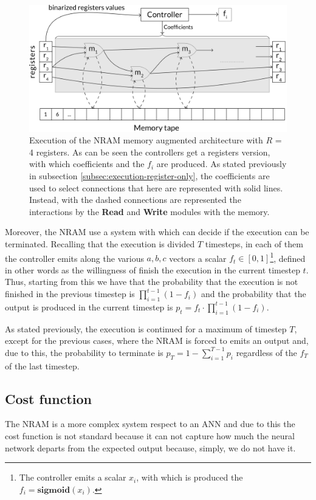 \begin{figure}[t!]
	\centering
	\includegraphics[width=\textwidth]{figures/memory-augmented-model.png}
	\caption{Execution of the NRAM memory augmented architecture with $R$ = 4 registers. As can be seen the controllers get a registers  version, with which coefficients and the $f_{i}$ are produced. As stated previously in subsection \ref{subsec:execution-register-only}, the coefficients are used to select connections that here are represented with solid lines. Instead, with the dashed connections are represented the interactions by the \textbf{Read} and \textbf{Write} modules with the memory.}
	\label{fig:perceptron-boundaries}
\end{figure}

Moreover, the NRAM use a system with which can decide if the execution can be terminated. Recalling that the execution is divided $T$ timesteps, in each of them the controller emits along the various $a, b, c$ vectors a scalar $f_{t} \in [0, 1]$\footnote{The controller emits a scalar $x_{i}$, with which is produced the $f_i = \textbf{sigmoid}(x_{i})$.}, defined in other words as the willingness of finish the execution in the current timestep $t$. Thus, starting from this we have that the probability that the execution is not finished in the previous timestep is $\prod\limits_{i=1}^{t-1}(1 - f_{i})$ and the probability that the output is produced in the current timestep is $p_{t} = f_{t} \cdot \prod\limits_{i=1}^{t-1}(1 - f_{i})$. 

As stated previously, the execution is continued for a maximum of timestep $T$, except for the previous cases, where the NRAM is forced to emits an output and, due to this, the probability to terminate is $p_{T} = 1 - \sum\limits_{i=1}^{T-1}p_{i}$ regardless of the $f_{T}$ of the last timestep.

\subsection{Cost function}
The NRAM is a more complex system respect to an ANN and due to this the cost function is not standard because it can not capture how much the neural network departs from the expected output because, simply, we do not have it. 

